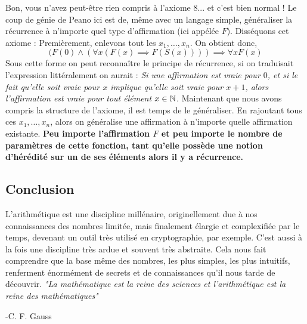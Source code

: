 Bon, vous n'avez peut-être rien compris à l'axiome 8... et c'est bien normal ! Le coup de génie de Peano ici est de, même avec un langage simple, généraliser la récurrence à n'importe quel type d'affirmation (ici appélée $F$). Disséquons cet axiome : \newline
\newline
Premièrement, enlevons tout les $x_1, \ldots, x_n$. On obtient donc, \newline
$$(F(0) \wedge (\forall x (F(x) \implies F(S(x)))) \implies \forall x F(x)$$ \newline
Sous cette forme on peut reconnaître le principe de récurrence, si on traduisait l'expression littéralement on aurait : \newline
\textit{Si une affirmation est vraie pour $0$, et si le fait qu'elle soit vraie pour $x$ implique qu'elle soit vraie pour $x+1$, alors l'affirmation est vraie pour tout élément $x \in \mathbb{N}$.} \newline
\newline
Maintenant que nous avons compris la structure de l'axiome, il est temps de le généraliser. \newline
En rajoutant tous ces $x_1, \ldots ,x_n$, alors on généralise une affirmation à n'importe quelle affirmation existante. \newline
\textbf{Peu importe l'affirmation $F$ et peu importe le nombre de paramètres de cette fonction, tant qu'elle possède une notion d'hérédité sur un de ses éléments alors il y a récurrence.}


\subsection{Conclusion}
L'arithmétique est une discipline millénaire, originellement due à nos connaissances des nombres limitée, mais finalement élargie et complexifiée par le temps, devenant un outil très utilisé en cryptographie, par exemple. \newline
C'est aussi à la fois une discipline très ardue et souvent très abstraite. Cela nous fait comprendre que la base même des nombres, les plus simples, les plus intuitifs, renferment énormément de secrets et de connaissances qu'il nous tarde de découvrir. \newline
\newline
\textit{"La mathématique est la reine des sciences et l’arithmétique est la reine des mathématiques"}
\begin{flushright}
-C. F. Gauss
\end{flushright}